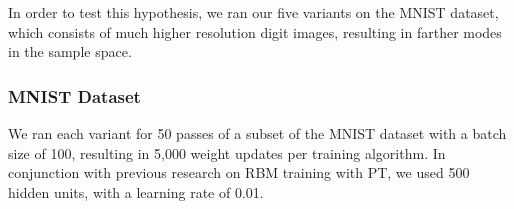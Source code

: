 In order to test this hypothesis, we ran our five variants on the MNIST dataset, which consists of much higher resolution digit images, resulting in farther modes in the sample space.

\subsubsection{MNIST Dataset}
We ran each variant for 50 passes of a subset of the MNIST dataset with a batch size of 100, resulting in 5,000 weight updates per training algorithm. In conjunction with previous research on RBM training with PT, we used 500 hidden units, with a learning rate of 0.01. 
